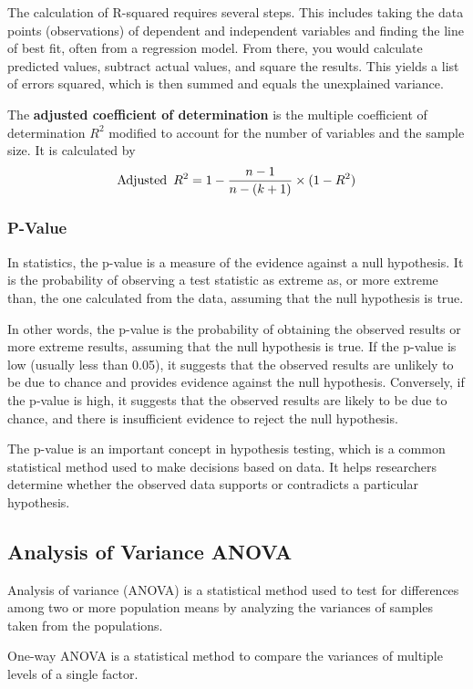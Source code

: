 The calculation of R-squared requires several steps. This includes taking the data points (observations) of dependent and independent variables and finding the line of best fit, often from a regression model. From there, you would calculate predicted values, subtract actual values, and square the results. This yields a list of errors squared, which is then summed and equals the unexplained variance.

The \textbf{adjusted coefficient of determination} is the multiple coefficient of determination $R^2$ modified to account for the number of variables and the sample size. It is calculated by
$$
\textup{Adjusted}\enskip R^2=1-\dfrac{n-1}{n-(k+1)}\times(1-R^2)
$$
\subsubsection{P-Value}
\noindent 

In statistics, the p-value is a measure of the evidence against a null hypothesis. It is the probability of observing a test statistic as extreme as, or more extreme than, the one calculated from the data, assuming that the null hypothesis is true.

In other words, the p-value is the probability of obtaining the observed results or more extreme results, assuming that the null hypothesis is true. If the p-value is low (usually less than 0.05), it suggests that the observed results are unlikely to be due to chance and provides evidence against the null hypothesis. Conversely, if the p-value is high, it suggests that the observed results are likely to be due to chance, and there is insufficient evidence to reject the null hypothesis.

The p-value is an important concept in hypothesis testing, which is a common statistical method used to make decisions based on data. It helps researchers determine whether the observed data supports or contradicts a particular hypothesis.
\subsection{Analysis of Variance ANOVA}

Analysis of variance (ANOVA) is a statistical method used to test for differences among two or more population means by analyzing the variances of samples taken from the populations.

One-way ANOVA is a statistical method to compare the variances of multiple levels of a single factor.

